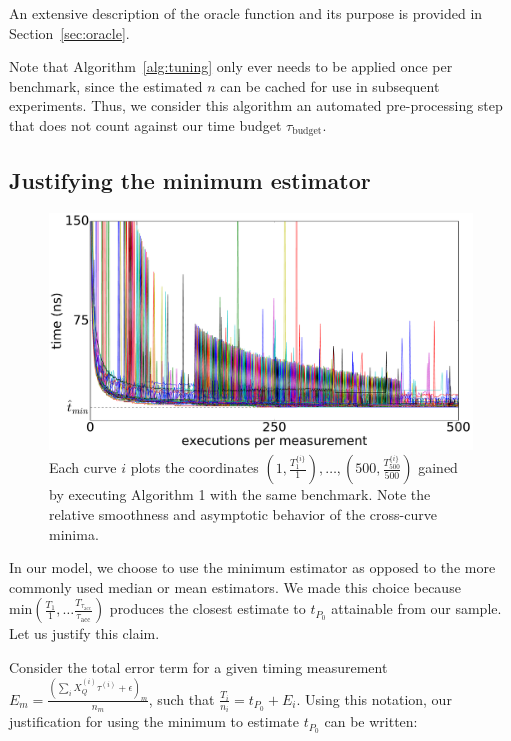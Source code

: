 \documentclass[conference]{IEEEtran}
\begin{document}
An extensive description of the oracle function and its purpose is provided in
Section~\ref{sec:oracle}.

Note that Algorithm~\ref{alg:tuning} only ever needs to be applied once per benchmark, since
the estimated $n$ can be cached for use in subsequent experiments. Thus, we consider this
algorithm an automated pre-processing step that does not count against our time budget
$\tau_{\textrm{budget}}$.

\subsection{Justifying the minimum estimator}
\label{sec:minimum}

\begin{figure}
\centering
\includegraphics[width=\columnwidth]{figures/fig2/linear_scan_branchsum}
\caption{Each curve $i$ plots the coordinates
$\left(1, \frac{T^{\{i\}}_1}{1}\right), \dots,
\left(500, \frac{T^{\{i\}}_{500}}{500}\right)$
gained by executing Algorithm 1 with the same benchmark. Note the relative
smoothness and asymptotic behavior of the cross-curve minima.}
\label{fig:scaling}
\end{figure}

In our model, we choose to use the minimum estimator as opposed to the more commonly used
median or mean estimators. We made this choice because $\textrm{min}(\frac{T_1}{1}, \dots
\frac{T_{\tau_{\textrm{acc}}}}{\tau_{\textrm{acc}}})$ produces the closest estimate to
$t_{P_0}$ attainable from our sample. Let us justify this claim.

Consider the total error term for a given timing measurement $E_m = \frac{\left(\sum_{i}
X_Q^{(i)} \tau^{(i)} + \epsilon \right)_m}{n_m}$, such that $\frac{T_i}{n_i} = t_{P_0} +
E_i$. Using this notation, our justification for using the minimum to estimate $t_{P_0}$ can
be written:
\end{document}
